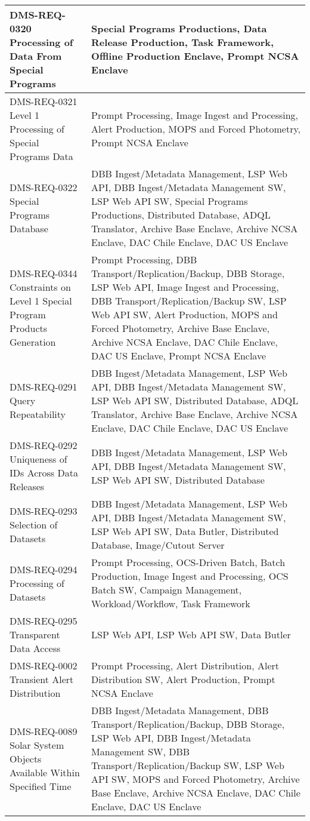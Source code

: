 \begin{longtable}{p{}p{}}
DMS-REQ-0320 Processing of Data From Special Programs & Special Programs Productions, Data Release Production, Task Framework, Offline Production Enclave, Prompt NCSA Enclave \\ \hline
DMS-REQ-0321 Level 1 Processing of Special Programs Data & Prompt Processing, Image Ingest and Processing, Alert Production, MOPS and Forced Photometry, Prompt NCSA Enclave \\ \hline
DMS-REQ-0322 Special Programs Database & DBB Ingest/Metadata Management, LSP Web API, DBB Ingest/Metadata Management SW, LSP Web API SW, Special Programs Productions, Distributed Database, ADQL Translator, Archive Base Enclave, Archive NCSA Enclave, DAC Chile Enclave, DAC US Enclave \\ \hline
DMS-REQ-0344 Constraints on Level 1 Special Program Products Generation & Prompt Processing, DBB Transport/Replication/Backup, DBB Storage, LSP Web API, Image Ingest and Processing, DBB Transport/Replication/Backup SW, LSP Web API SW, Alert Production, MOPS and Forced Photometry, Archive Base Enclave, Archive NCSA Enclave, DAC Chile Enclave, DAC US Enclave, Prompt NCSA Enclave \\ \hline
DMS-REQ-0291 Query Repeatability & DBB Ingest/Metadata Management, LSP Web API, DBB Ingest/Metadata Management SW, LSP Web API SW, Distributed Database, ADQL Translator, Archive Base Enclave, Archive NCSA Enclave, DAC Chile Enclave, DAC US Enclave \\ \hline
DMS-REQ-0292 Uniqueness of IDs Across Data Releases & DBB Ingest/Metadata Management, LSP Web API, DBB Ingest/Metadata Management SW, LSP Web API SW, Distributed Database \\ \hline
DMS-REQ-0293 Selection of Datasets & DBB Ingest/Metadata Management, LSP Web API, DBB Ingest/Metadata Management SW, LSP Web API SW, Data Butler, Distributed Database, Image/Cutout Server \\ \hline
DMS-REQ-0294 Processing of Datasets & Prompt Processing, OCS-Driven Batch, Batch Production, Image Ingest and Processing, OCS Batch SW, Campaign Management, Workload/Workflow, Task Framework \\ \hline
DMS-REQ-0295 Transparent Data Access & LSP Web API, LSP Web API SW, Data Butler \\ \hline
DMS-REQ-0002 Transient Alert Distribution & Prompt Processing, Alert Distribution, Alert Distribution SW, Alert Production, Prompt NCSA Enclave \\ \hline
DMS-REQ-0089 Solar System Objects Available Within Specified Time & DBB Ingest/Metadata Management, DBB Transport/Replication/Backup, DBB Storage, LSP Web API, DBB Ingest/Metadata Management SW, DBB Transport/Replication/Backup SW, LSP Web API SW, MOPS and Forced Photometry, Archive Base Enclave, Archive NCSA Enclave, DAC Chile Enclave, DAC US Enclave \\ \hline

\end{longtable}
